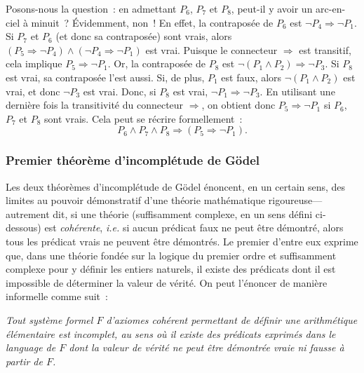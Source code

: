 Posons-nous la question : en admettant $P_6$, $P_7$ et $P_8$, peut-il y avoir un arc-en-ciel à minuit ? 
Évidemment, non ! 
En effet, la contraposée de $P_6$ est $\neg  P_4 \Rightarrow \neg P_1$. 
Si $P_7$ et $P_6$ (et donc sa contraposée) sont vrais, alors $(P_5 \Rightarrow \neg P_4) \wedge (\neg  P_4 \Rightarrow \neg P_1)$ est vrai. 
Puisque le connecteur $\Rightarrow$ est transitif, cela implique $P_5 \Rightarrow \neg P_1$. 
Or, la contraposée de $P_8$ est $\neg (P_1 \wedge P_2) \Rightarrow \neg P_3$. 
Si $P_8$ est vrai, sa contraposée l'est aussi. 
Si, de plus, $P_1$ est faux, alors $\neg (P_1 \wedge P_2)$ est vrai, et donc $\neg P_3$ est vrai. 
Donc, si $P_8$ est vrai, $\neg P_1 \Rightarrow \neg P_3$. 
En utilisant une dernière fois la transitivité du connecteur $\Rightarrow$, on obtient donc $P_5 \Rightarrow \neg P_1$ si $P_6$, $P_7$ et $P_8$ sont vrais. 
Cela peut se récrire formellement : 
\begin{equation*}
    P_6 \wedge P_7 \wedge P_8 \Rightarrow (P_5 \Rightarrow \neg P_1). 
\end{equation*}

\subsubsection{Premier théorème d'incomplétude de Gödel}

Les deux théorèmes d'incomplétude de Gödel énoncent, en un certain sens, des limites au pouvoir démonstratif d'une théorie mathématique rigoureuse—autrement dit, si une théorie (suffisamment complexe, en un sens défini ci-dessous) est \emph{cohérente}, \emph{i.e.} si aucun prédicat faux ne peut être démontré, alors tous les prédicat vrais ne peuvent être démontrés. 
Le premier d'entre eux exprime que, dans une théorie fondée sur la logique du premier ordre et suffisamment complexe pour y définir les entiers naturels, il existe des prédicats dont il est impossible de déterminer la valeur de vérité.
On peut l'énoncer de manière informelle comme suit : 

\medskip

\noindent \textit{Tout système formel $F$ d'axiomes cohérent permettant de définir une arithmétique élémentaire est incomplet, au sens où il existe des prédicats exprimés dans le language de $F$ dont la valeur de vérité ne peut être démontrée vraie ni fausse à partir de $F$.}

\medskip

